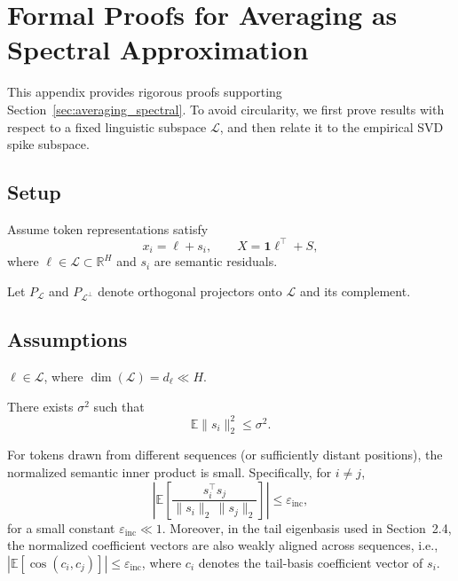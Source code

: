 \appendix
\section{Formal Proofs for Averaging as Spectral Approximation}
\label{app:proofs}

This appendix provides rigorous proofs supporting
Section~\ref{sec:averaging_spectral}.
To avoid circularity, we first prove results with respect to a fixed linguistic
subspace $\mathcal L$, and then relate it to the empirical SVD spike subspace.

\subsection{Setup}

Assume token representations satisfy
\[
x_i = \ell + s_i,
\qquad
X = \mathbf{1}\ell^\top + S,
\]
where $\ell \in \mathcal L \subset \mathbb{R}^H$ and $s_i$ are semantic residuals.

Let $P_{\mathcal L}$ and $P_{\mathcal L^\perp}$ denote orthogonal projectors onto
$\mathcal L$ and its complement.

\subsection{Assumptions}

\begin{assumption}
$\ell \in \mathcal L$, where $\dim(\mathcal L)=d_\ell \ll H$.
\end{assumption}

\begin{assumption}
There exists $\sigma^2$ such that
\[
\mathbb{E}\|s_i\|_2^2 \le \sigma^2.
\]
\end{assumption}

\begin{assumption}
For tokens drawn from different sequences (or sufficiently distant positions),
the normalized semantic inner product is small. Specifically, for $i \neq j$,
\begin{equation}
\label{eq:assump_cos_incoh}
\left|
\mathbb{E}\!\left[
\frac{s_i^\top s_j}{\|s_i\|_2\,\|s_j\|_2}
\right]
\right|
\le \varepsilon_{\mathrm{inc}},
\end{equation}
for a small constant $\varepsilon_{\mathrm{inc}} \ll 1$.
Moreover, in the tail eigenbasis used in Section~2.4, the normalized coefficient
vectors are also weakly aligned across sequences, i.e.,
$\left|\mathbb{E}[\cos(c_i, c_j)]\right| \le \varepsilon_{\mathrm{inc}}$, where
$c_i$ denotes the tail-basis coefficient vector of $s_i$.
\end{assumption}

